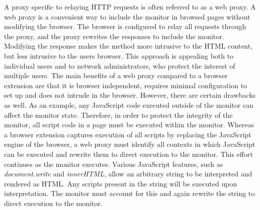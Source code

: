 \documentclass{llncs}
\begin{document}
A proxy specific to relaying HTTP requests is often referred to as a web proxy.
A web proxy is a convenient way to include the monitor in browsed pages without 
modifying the browser. The browser is configured to relay 
all requests through the proxy, and the proxy rewrites the responses to include 
the monitor. Modifying the response makes the method more 
intrusive to the HTML content, but less intrusive to the users browser. 
This approach is appealing both to individual users and to network 
administrators, who protect the interest of multiple users. The main benefits of 
a web proxy compared to a browser extension are that it is browser independent, requires 
minimal configuration to set up and does not intrude in the browser. However, there 
are certain drawbacks as well. 
%
As an example, any JavaScript code executed outside of the monitor can affect 
the monitor state. Therefore, in order to protect the integrity of the monitor, all 
script code in a page must be executed within the monitor. Whereas a 
browser extension captures execution of all scripts by replacing the JavaScript 
engine of the browser, a web proxy must identify all contexts in which JavaScript 
can be executed and rewrite them to direct execution to the monitor.
%
This effort continues as the monitor executes. Various JavaScript features, such as 
\emph{document.write} and \emph{innerHTML}, allow an arbitrary string to be 
interpreted and rendered as HTML. Any scripts present in the string will be 
executed upon interpretation. The monitor must account for this and again rewrite 
the string to direct execution to the monitor.
\end{document}
